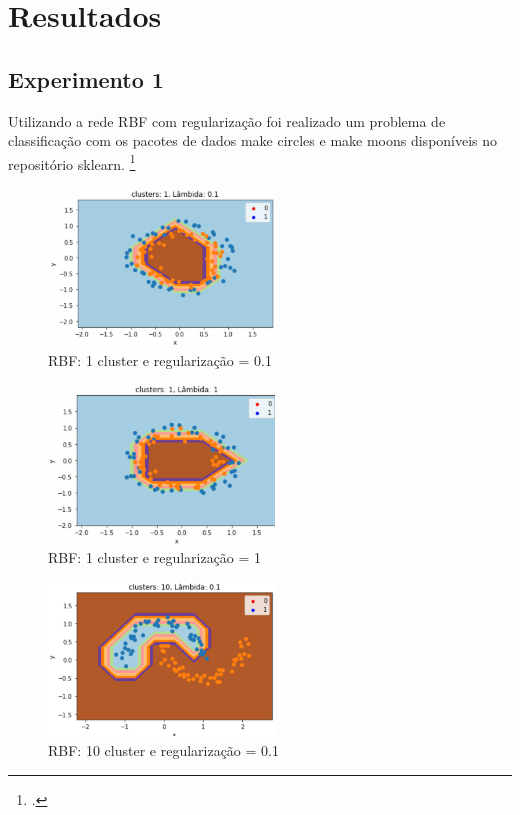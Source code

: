 \section{Resultados}

\subsection*{Experimento 1}
Utilizando a rede RBF com regularização foi realizado um problema de classificação com os pacotes de dados make circles e make moons disponíveis no repositório sklearn. \footcite{https://scikit-learn.org/stable/}

\begin{figure}[H]
    \center
    \includegraphics[width=6cm]{images/img1.png}
    \caption{\label{img1}RBF: 1 cluster e regularização = 0.1}
  \end{figure}

  \begin{figure}[H]
    \center
    \includegraphics[width=6cm]{images/img2.png}
    \caption{\label{img2}RBF: 1 cluster e regularização = 1}
  \end{figure}

  \begin{figure}[H]
    \center
    \includegraphics[width=6cm]{images/img3.png}
    \caption{\label{img3}RBF: 10 cluster e regularização = 0.1}
  \end{figure}

